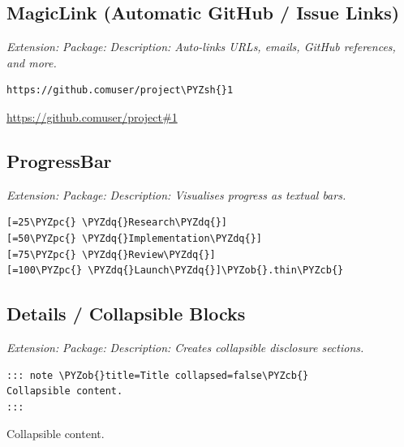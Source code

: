 \documentclass[a4paper,twoside]{article}
\begin{document}
\subsection{MagicLink (Automatic GitHub / Issue Links)}
\emph{Extension: }
\emph{Package: }
\emph{Description: Auto-links URLs, emails, GitHub references, and more.}
\begin{tscode}[lang=md, engine=pygments]
\begin{Verbatim}[commandchars=\\\{\},breaklines, breakanywhere, commandchars=\\\{\}]
https://github.comuser/project\PYZsh{}1
\end{Verbatim}
\end{tscode}
\begin{displayquote}
\url{https://github.comuser/project\#1}
\end{displayquote}
\subsection{ProgressBar}
\emph{Extension: }
\emph{Package: }
\emph{Description: Visualises progress as textual bars.}
\begin{tscode}[lang=markdown, engine=pygments]
\begin{Verbatim}[commandchars=\\\{\},breaklines, breakanywhere, commandchars=\\\{\}]
[=25\PYZpc{} \PYZdq{}Research\PYZdq{}]
[=50\PYZpc{} \PYZdq{}Implementation\PYZdq{}]
[=75\PYZpc{} \PYZdq{}Review\PYZdq{}]
[=100\PYZpc{} \PYZdq{}Launch\PYZdq{}]\PYZob{}.thin\PYZcb{}
\end{Verbatim}
\end{tscode}
\subsection{Details / Collapsible Blocks}
\emph{Extension: }
\emph{Package: }
\emph{Description: Creates collapsible disclosure sections.}
\begin{tscode}[lang=md, engine=pygments]
\begin{Verbatim}[commandchars=\\\{\},breaklines, breakanywhere, commandchars=\\\{\}]
::: note \PYZob{}title=Title collapsed=false\PYZcb{}
Collapsible content.
:::
\end{Verbatim}
\end{tscode}
\begin{displayquote}
\begin{tscallout}[kind=note, title={Title}]
Collapsible content.
\end{tscallout}
\end{displayquote}
\end{document}
